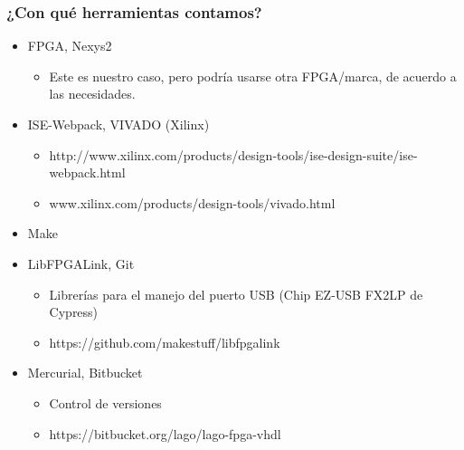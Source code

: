 \documentclass{beamer}
\begin{document}
\begin{frame}
  \frametitle{¿Con qué herramientas contamos?}
  \begin{block}{}
    \begin{itemize}
      \item  FPGA, Nexys2
        \begin{itemize}
          \item Este es nuestro caso, pero podría usarse otra
                FPGA/marca, de acuerdo a las necesidades.
        \end{itemize}
      \item  ISE-Webpack, VIVADO (Xilinx)
      \begin{itemize}
        \item
http://www.xilinx.com/products/design-tools/ise-design-suite/ise-webpack.html
        \item www.xilinx.com/products/design-tools/vivado.html
      \end{itemize}
      \item  Make
      \item  LibFPGALink, Git
      \begin{itemize}
        \item Librerías para el manejo del puerto USB (Chip EZ-USB FX2LP de
							Cypress)
        \item https://github.com/makestuff/libfpgalink
      \end{itemize}
      \item  Mercurial, Bitbucket
      \begin{itemize}
        \item Control de versiones
        \item https://bitbucket.org/lago/lago-fpga-vhdl
      \end{itemize}
    \end{itemize}
\end{block}
\end{frame}
\end{document}
